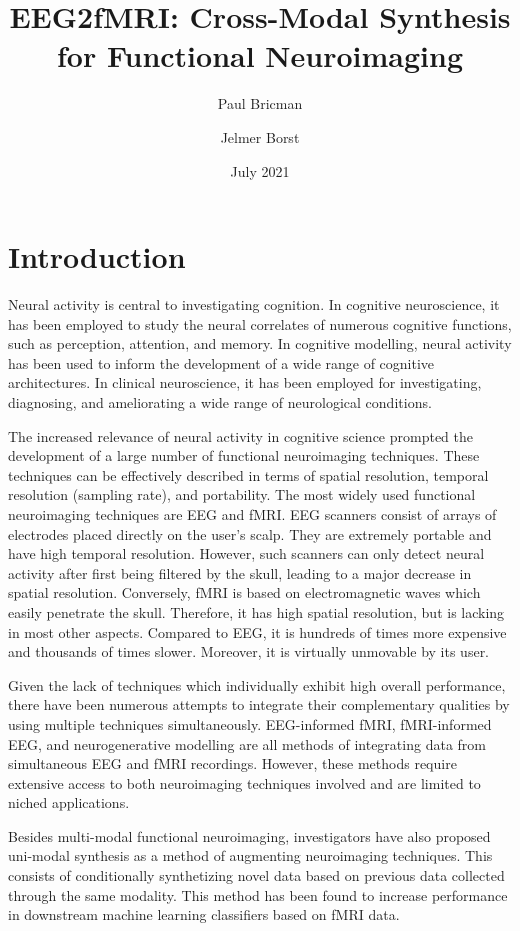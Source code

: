\documentclass{article}
\title{EEG2fMRI: Cross-Modal Synthesis for Functional Neuroimaging}
\author{Paul Bricman}
\author{Jelmer Borst}
\affil{University of Groningen}
\date{July 2021}
\begin{document}
\maketitle

\section{Introduction}

Neural activity is central to investigating cognition. In cognitive neuroscience, it has been employed to study the neural correlates of numerous cognitive functions, such as perception, attention, and memory. In cognitive modelling, neural activity has been used to inform the development of a wide range of cognitive architectures. In clinical neuroscience, it has been employed for investigating, diagnosing, and ameliorating a wide range of neurological conditions. 

The increased relevance of neural activity in cognitive science prompted the development of a large number of functional neuroimaging techniques. These techniques can be effectively described in terms of spatial resolution, temporal resolution (sampling rate), and portability. The most widely used functional neuroimaging techniques are EEG and fMRI. EEG scanners consist of arrays of electrodes placed directly on the user's scalp. They are extremely portable and have high temporal resolution. However, such scanners can only detect neural activity after first being filtered by the skull, leading to a major decrease in spatial resolution. Conversely, fMRI is based on electromagnetic waves which easily penetrate the skull. Therefore, it has high spatial resolution, but is lacking in most other aspects. Compared to EEG, it is hundreds of times more expensive and thousands of times slower. Moreover, it is virtually unmovable by its user.

Given the lack of techniques which individually exhibit high overall performance, there have been numerous attempts to integrate their complementary qualities by using multiple techniques simultaneously. EEG-informed fMRI, fMRI-informed EEG, and neurogenerative modelling are all methods of integrating data from simultaneous EEG and fMRI recordings. However, these methods require extensive access to both neuroimaging techniques involved and are limited to niched applications.

Besides multi-modal functional neuroimaging, investigators have also proposed uni-modal synthesis as a method of augmenting neuroimaging techniques. This consists of conditionally synthetizing novel data based on previous data collected through the same modality. This method has been found to increase performance in downstream machine learning classifiers based on fMRI data.
\end{document}

